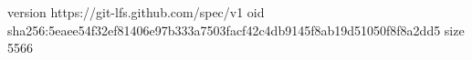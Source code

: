 version https://git-lfs.github.com/spec/v1
oid sha256:5eaee54f32ef81406e97b333a7503facf42c4db9145f8ab19d51050f8f8a2dd5
size 5566
